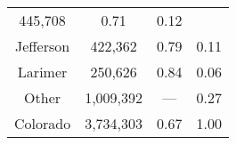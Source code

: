 \documentclass[12pt,twoside]{reedthesis}
\begin{document}
\begin{longtable}[]{@{}cccl@{}}
\begin{minipage}[t]{0.24\columnwidth}
  445,708\strut
  \end{minipage} & \begin{minipage}[t]{0.29\columnwidth}\centering\strut
  0.71\strut
  \end{minipage} & \begin{minipage}[t]{0.25\columnwidth}\raggedright\strut
  0.12\strut
  \end{minipage}\tabularnewline
  \begin{minipage}[t]{0.10\columnwidth}\centering\strut
  Jefferson\strut
  \end{minipage} & \begin{minipage}[t]{0.24\columnwidth}\centering\strut
  422,362\strut
  \end{minipage} & \begin{minipage}[t]{0.29\columnwidth}\centering\strut
  0.79\strut
  \end{minipage} & \begin{minipage}[t]{0.25\columnwidth}\raggedright\strut
  0.11\strut
  \end{minipage}\tabularnewline
  \begin{minipage}[t]{0.10\columnwidth}\centering\strut
  Larimer\strut
  \end{minipage} & \begin{minipage}[t]{0.24\columnwidth}\centering\strut
  250,626\strut
  \end{minipage} & \begin{minipage}[t]{0.29\columnwidth}\centering\strut
  0.84\strut
  \end{minipage} & \begin{minipage}[t]{0.25\columnwidth}\raggedright\strut
  0.06\strut
  \end{minipage}\tabularnewline
  \begin{minipage}[t]{0.10\columnwidth}\centering\strut
  Other\strut
  \end{minipage} & \begin{minipage}[t]{0.24\columnwidth}\centering\strut
  1,009,392\strut
  \end{minipage} & \begin{minipage}[t]{0.29\columnwidth}\centering\strut
  ---\strut
  \end{minipage} & \begin{minipage}[t]{0.25\columnwidth}\raggedright\strut
  0.27\strut
  \end{minipage}\tabularnewline
  \begin{minipage}[t]{0.10\columnwidth}\centering\strut
  Colorado\strut
  \end{minipage} & \begin{minipage}[t]{0.24\columnwidth}\centering\strut
  3,734,303\strut
  \end{minipage} & \begin{minipage}[t]{0.29\columnwidth}\centering\strut
  0.67\strut
  \end{minipage} & \begin{minipage}[t]{0.25\columnwidth}\raggedright\strut
  1.00\strut
  \end{minipage}\tabularnewline
  \bottomrule
  \end{longtable}
  
\end{document}
